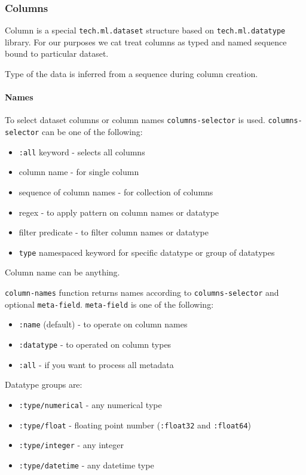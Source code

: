 \documentclass[]{article}
\providecommand{\tightlist}{%
  \setlength{\itemsep}{0pt}\setlength{\parskip}{0pt}}
\let\oldparagraph\paragraph
\renewcommand{\paragraph}[1]{\oldparagraph{#1}\mbox{}}
\begin{document}
\subsubsection{Columns}\label{columns}

Column is a special \texttt{tech.ml.dataset} structure based on
\texttt{tech.ml.datatype} library. For our purposes we cat treat columns
as typed and named sequence bound to particular dataset.

Type of the data is inferred from a sequence during column creation.

\paragraph{Names}\label{names}

To select dataset columns or column names \texttt{columns-selector} is
used. \texttt{columns-selector} can be one of the following:

\begin{itemize}
\tightlist
\item
  \texttt{:all} keyword - selects all columns
\item
  column name - for single column
\item
  sequence of column names - for collection of columns
\item
  regex - to apply pattern on column names or datatype
\item
  filter predicate - to filter column names or datatype
\item
  \texttt{type} namespaced keyword for specific datatype or group of
  datatypes
\end{itemize}

Column name can be anything.

\texttt{column-names} function returns names according to
\texttt{columns-selector} and optional \texttt{meta-field}.
\texttt{meta-field} is one of the following:

\begin{itemize}
\tightlist
\item
  \texttt{:name} (default) - to operate on column names
\item
  \texttt{:datatype} - to operated on column types
\item
  \texttt{:all} - if you want to process all metadata
\end{itemize}

Datatype groups are:

\begin{itemize}
\tightlist
\item
  \texttt{:type/numerical} - any numerical type
\item
  \texttt{:type/float} - floating point number (\texttt{:float32} and
  \texttt{:float64})
\item
  \texttt{:type/integer} - any integer
\item
  \texttt{:type/datetime} - any datetime type
\end{itemize}
\end{document}
